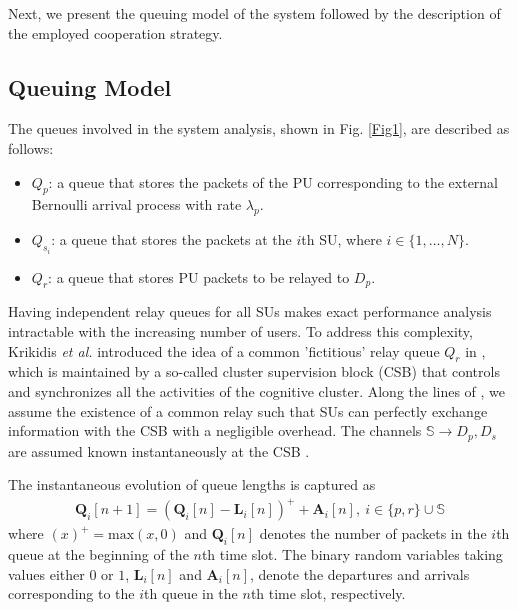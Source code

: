 \documentclass[journal,twocolumn]{IEEEtran}
\begin{document}
Next, we present the queuing model of the system followed by the description of the employed cooperation strategy.

\subsection{Queuing Model}
The queues involved in the system analysis, shown in Fig. \ref{Fig1}, are described as follows:
\begin{itemize}
\item $Q_{p}$: a queue that stores the packets of the PU corresponding to the external Bernoulli arrival process with rate $\lambda_{p}$.

\item $Q_{s_{i}}$: a queue that stores the packets at the $i$th SU, where $i \in \{1,\hdots,N\}$.

\item $Q_{r}$: a queue that stores PU packets to be relayed to $D_{p}$.
\end{itemize}
Having independent relay queues for all SUs makes exact performance analysis intractable with the increasing number of users. To address this complexity, Krikidis \emph{et al.} introduced the idea of a common 'fictitious' relay queue $Q_{r}$ in \cite{Krikidis}, which is maintained by a so-called cluster supervision block (CSB) that controls and synchronizes all the activities of the cognitive cluster.
Along the lines of  \cite{Krikidis}, we assume the existence of a common relay such that SUs can perfectly exchange information with the CSB with a negligible overhead. The channels $\mathbb{S} \rightarrow D_{p},D_{s}$ are assumed known instantaneously at the CSB \cite{Krikidis,jovicic}.

The instantaneous evolution of queue lengths is captured as
\begin{align}\label{queue evolution}
\mathbf{Q}_{i}[n+1]= \left(\mathbf{Q}_{i}[n] - \mathbf{L}_{i}[n]\right)^{+} + \mathbf{A}_{i}[n], ~i \in \{p,r\} \cup \mathbb{S}
\end{align}
where $(x)^{+}=\text{max}(x,0)$ and $\mathbf{Q}_{i}[n]$ denotes the number of packets in the $i$th queue at the beginning of the $n$th time slot. The
binary random variables taking values either $0$ or $1$, $\mathbf{L}_{i}[n]$ and $\mathbf{A}_{i}[n]$, denote the departures and arrivals corresponding to the
$i$th queue in the $n$th time slot, respectively.
\end{document}
